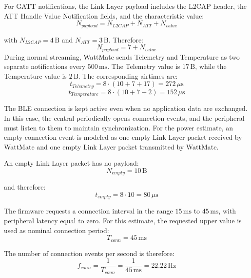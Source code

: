 For GATT notifications, the Link Layer payload includes the L2CAP header, the ATT Handle Value Notification fields, and the characteristic value:
\begin{equation}
	N_{payload} = N_{L2CAP} + N_{ATT} + N_{value}
\end{equation}

with \(N_{L2CAP}=4\,\mathrm{B}\) and \(N_{ATT}=3\,\mathrm{B}\). 
Therefore:
\begin{equation}
	N_{payload} = 7 + N_{value}
\end{equation}
During normal streaming, WattMate sends Telemetry and Temperature as two separate notifications every \(500\,\mathrm{ms}\). 
The Telemetry value is \(17\,\mathrm{B}\), while the Temperature value is \(2\,\mathrm{B}\). 
The corresponding airtimes are:
\begin{equation}
	t_{Telemetry} = 8 \cdot \left(10 + 7 + 17\right) = 272\,\mu\mathrm{s}
\end{equation}
\begin{equation}
	t_{Temperature} = 8 \cdot \left(10 + 7 + 2\right) = 152\,\mu\mathrm{s}
\end{equation}

The BLE connection is kept active even when no application data are exchanged. 
In this case, the central periodically opens connection events, and the peripheral must listen to them to maintain synchronization. 
For the power estimate, an empty connection event is modeled as one empty Link Layer packet received by WattMate and one empty Link Layer packet transmitted by WattMate.

An empty Link Layer packet has no payload:
\begin{equation}
	N_{empty} = 10\,\mathrm{B}
\end{equation}

and therefore:
\begin{equation}
	t_{empty} = 8 \cdot 10 = 80\,\mu\mathrm{s}
\end{equation}

The firmware requests a connection interval in the range \(15\,\mathrm{ms}\) to \(45\,\mathrm{ms}\), with peripheral latency equal to zero. 
For this estimate, the requested upper value is used as nominal connection period:
\begin{equation}
	T_{conn} = 45\,\mathrm{ms}
\end{equation}

The number of connection events per second is therefore:
\begin{equation}
	f_{conn} = \frac{1}{T_{conn}} = \frac{1}{45\,\mathrm{ms}} = 22.22\,\mathrm{Hz}
\end{equation}

